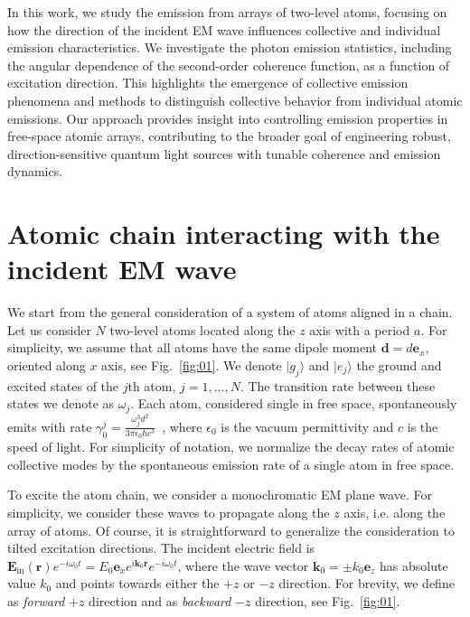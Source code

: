 \documentclass[aps,prl,twocolumn,superscriptaddress,showpacs,amsmath,amssymb]{revtex4-2}
\begin{document}
In this work, we study the emission from arrays of two-level atoms, focusing on how the direction of the incident EM wave influences collective and individual emission characteristics. 
We investigate the photon emission statistics, including the angular dependence of the second-order coherence function, as a function of excitation direction. This highlights the emergence of collective emission phenomena and methods to distinguish collective behavior from individual atomic emissions. 
Our approach provides insight into controlling emission properties in free-space atomic arrays, contributing to the broader goal of engineering robust, direction-sensitive quantum light sources with tunable coherence and emission dynamics.


\section{Atomic chain interacting with the incident EM wave}

We start from the general consideration of a system of atoms aligned in a chain. 
Let us consider $N$ two-level atoms located along the $z$ axis with a period $a$.
For simplicity, we assume that all atoms have the same dipole moment $\mathbf{d} = d \mathbf{e}_x$, oriented along $x$ axis, see Fig.~\ref{fig:01}.
We denote $|g_j\rangle$ and $|e_j\rangle$ the ground and excited states of the $j$th atom, $j = 1, \ldots, N$.
The transition rate between these states we denote as $\omega_j$.
Each atom, considered single in free space, spontaneously emits with rate $\gamma_0^j = \frac{\omega_j^3 d^2}{3 \pi \epsilon_0 \hbar c^3}$~\cite{carmichael1999statistical}, where $\epsilon_0$ is the vacuum permittivity and $c$ is the speed of light.
For simplicity of notation, we normalize the decay rates of atomic collective modes by the spontaneous emission rate of a single atom in free space.

To excite the atom chain, we consider a monochromatic EM plane wave.
For simplicity, we consider these waves to propagate along the $z$ axis, i.e. along the array of atoms.
Of course, it is straightforward to generalize the consideration to tilted excitation directions.
The incident electric field is $\mathbf{E}_\mathrm{in}(\mathbf{r})e^{- i \omega_0 t} = E_0 \mathbf{e}_x e^{i \mathbf{k}_0 \mathbf{r}} e^{- i \omega_0 t}$, where the wave vector $\mathbf{k}_0 = \pm k_0 \mathbf{e}_z$ has absolute value $k_0$ and points towards either the $+z$ or $-z$ direction. 
For brevity, we define as \textit{forward} $+z$ direction and as \textit{backward} $-z$ direction, see Fig.~\ref{fig:01}.
\end{document}
